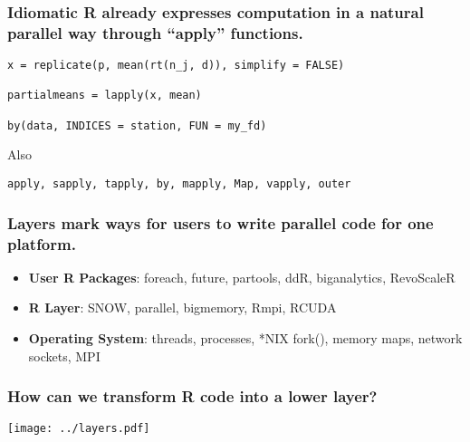 \documentclass{beamer}
\begin{document}
\begin{frame}[fragile]

    \frametitle{Idiomatic R already expresses computation in a natural
    parallel way through ``apply'' functions.}


\begin{verbatim}
x = replicate(p, mean(rt(n_j, d)), simplify = FALSE)

partialmeans = lapply(x, mean)

by(data, INDICES = station, FUN = my_fd)
\end{verbatim}

\pause

Also
\begin{verbatim}
apply, sapply, tapply, by, mapply, Map, vapply, outer
\end{verbatim}

\end{frame}
\begin{frame}

    \frametitle{Layers mark ways for users to write parallel code for one
    platform.}


\begin{itemize}
    \item \textbf{User R Packages}: foreach, future, partools, ddR, biganalytics, RevoScaleR
    \item \textbf{R Layer}: SNOW, parallel, bigmemory, Rmpi, RCUDA
    \item \textbf{Operating System}: threads, processes, *NIX fork(), memory maps, network sockets, MPI
\end{itemize}

\end{frame}
\begin{frame}

    \frametitle{How can we transform R code into a lower layer?}


\centerline{\texttt{[image: ../layers.pdf]}}

\end{frame}
\end{document}
